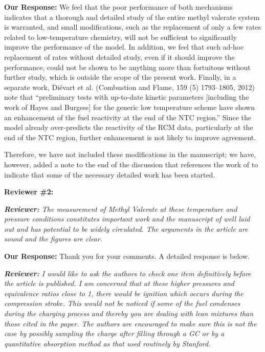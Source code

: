 \documentclass{article}
\newenvironment{reviewer}{\vspace{0.5\baselineskip}\begingroup\itshape\textbf{Reviewer:}}{\endgroup\vspace{0.5\baselineskip}}
\newenvironment{response}{\vspace{0.5\baselineskip}\textbf{Our Response:}}{\vspace{0.5\baselineskip}}
\begin{document}
\begin{response}
    We feel that the poor performance of both mechanisms indicates that a thorough and detailed
    study of the entire methyl valerate system is warranted, and small modifications, such as the
    replacement of only a few rates related to low-temperature chemistry, will not be sufficient to
    significantly improve the performance of the model. In addition, we feel that such ad-hoc
    replacement of rates without detailed study, even if it should improve the performance, could
    not be shown to be anything more than fortuitous without further study, which is outside the
    scope of the present work. Finally, in a separate work, Di\'{e}vart et al. (Combustion and
    Flame, 159 (5) 1793--1805, 2012) note that ``preliminary tests with up-to-date kinetic
    parameters [including the work of Hayes and Burgess] for the generic low temperature scheme have
    shown an enhancement of the fuel reactivity at the end of the NTC region.'' Since the model
    already over-predicts the reactivity of the RCM data, particularly at the end of the NTC region,
    further enhancement is not likely to improve agreement.

    Therefore, we have not included these modifications in the manuscript; we have, however, added a
    note to the end of the discussion that references the work of \citet{Hayes2009} to indicate that
    some of the necessary detailed work has been started.
\end{response}

\noindent \textbf{Reviewer \#2:}

\begin{reviewer}
    The measurement of Methyl Valerate at these temperature and pressure conditions constitutes
    important work and the manuscript of well laid out and has potential to be widely circulated.
    The arguments in the article are sound and the figures are clear.
\end{reviewer}

\begin{response}
    Thank you for your comments. A detailed response is below.
\end{response}

\begin{reviewer}
    I would like to ask the authors to check one item definitively before the article is published.
    I am concerned that at these higher pressures and equivalence ratios close to 1, there would be
    ignition which occurs during the compression stroke. This would not be noticed if some of the
    fuel condenses during the charging process and thereby you are dealing with lean mixtures than
    those cited in the paper. The authors are encouraged to make sure this is not the case by
    possibly sampling the charge after filling through a GC or by a quantitative absorption method
    as that used routinely by Stanford.
\end{reviewer}
\end{document}
